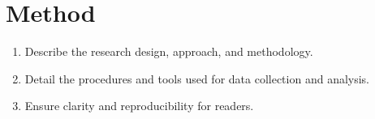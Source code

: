 \section{Method}

\begin{enumerate}
    \item Describe the research design, approach, and methodology.
    \item Detail the procedures and tools used for data collection and analysis.
    \item Ensure clarity and reproducibility for readers.
\end{enumerate}